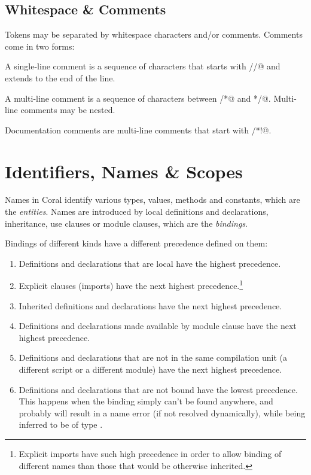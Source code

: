 \section{Whitespace \& Comments}\label{sec:whitespacecomments}

Tokens may be separated by whitespace characters and/or comments. Comments come in two forms: 

A single-line comment is a sequence of characters that starts with \lstinline@//@ and extends to the end of the line. 

A multi-line comment is a sequence of characters between \lstinline@/*@ and \lstinline@*/@. Multi-line comments may be nested. 

Documentation comments are multi-line comments that start with \lstinline@/*!@. 

\chapter{Identifiers, Names \& Scopes}

Names in Coral identify various types, values, methods and constants, which are the \emph{entities}. Names are introduced by local definitions and declarations, inheritance, use clauses or module clauses, which are the \emph{bindings}. 

Bindings of different kinds have a different precedence defined on them: 

\begin{enumerate}
\item Definitions and declarations that are local have the highest precedence. 
\item Explicit \lstinline@use@ clauses (imports) have the next highest precedence.\footnote{Explicit imports have such high precedence in order to allow binding of different names than those that would be otherwise inherited.} 
\item Inherited definitions and declarations have the next highest precedence. 
\item Definitions and declarations made available by module clause have the next highest precedence. 
\item Definitions and declarations that are not in the same compilation unit (a different script or a different module) have the next highest precedence. 
\item Definitions and declarations that are not bound have the lowest precedence. This happens when the binding simply can't be found anywhere, and probably will result in a name error (if not resolved dynamically), while being inferred to be of type \lstinline@Object@. 
\end{enumerate}

